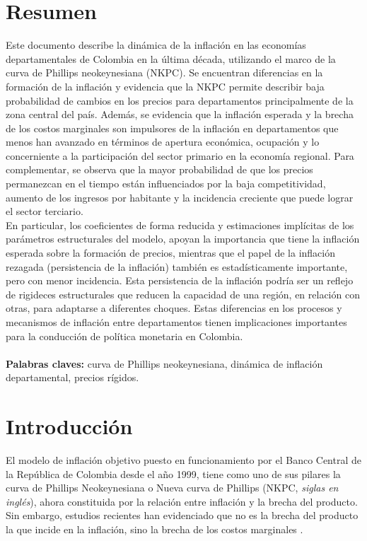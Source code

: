 \chapter*{Resumen} \label{resumen}
Este documento describe la dinámica de la inflación en las economías departamentales de Colombia en la última década, utilizando el marco de la curva de Phillips neokeynesiana (NKPC). Se encuentran diferencias en la formación de la inflación y evidencia que la NKPC permite describir baja probabilidad de cambios en los precios para departamentos principalmente de la zona central del país. Además, se evidencia que la inflación esperada y la brecha de los costos marginales  son impulsores de la inflación en departamentos que menos han avanzado en términos de apertura económica, ocupación y lo concerniente a la participación del sector primario en la economía regional. Para complementar, se observa que la mayor probabilidad de que los precios permanezcan en el tiempo están influenciados por la baja competitividad, aumento de los ingresos por habitante y la incidencia creciente que puede lograr el sector terciario.\\
 
En particular, los coeficientes de forma reducida y estimaciones implícitas de los parámetros estructurales del modelo, apoyan la importancia que tiene la inflación esperada sobre la formación de precios, mientras que el papel de la inflación rezagada (persistencia de la inflación) también es estadísticamente importante, pero con menor incidencia. Esta persistencia de la inflación podría ser un reflejo de rigideces estructurales  que reducen la capacidad de una región, en relación con otras, para adaptarse a diferentes choques. Estas diferencias en los procesos y mecanismos de inflación entre departamentos tienen implicaciones importantes para la conducción de política monetaria en Colombia.
\\\\

\textbf{Palabras claves:} curva de Phillips neokeynesiana, dinámica de inflación departamental, precios rígidos.

\chapter*{Introducción}

El modelo de inflación objetivo puesto en funcionamiento por el Banco Central de la República de Colombia desde el año 1999, tiene como uno de sus pilares la curva de Phillips Neokeynesiana o Nueva curva de Phillips (NKPC, \textit{siglas en inglés}), ahora constituida por la relación entre inflación y la brecha del producto.  Sin embargo, estudios recientes han evidenciado que no es la brecha del producto la que incide en la inflación,  sino la brecha de los costos marginales \citep{gali1999inflation,gali2002new,rumler2007estimates,ramos2008inflation}.\\

